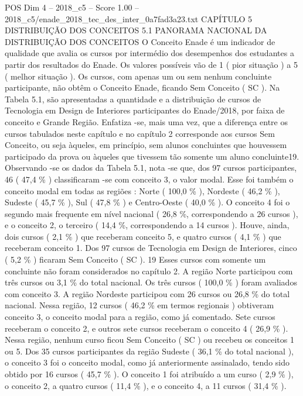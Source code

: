 \begin{textsample}{POS Dim 4 – 2018\_c5 – Score 1.00 – 2018\_c5/enade\_2018\_tec\_des\_inter\_0a7fad3a23.txt}  \label{ex:f4_pos_225}
CAPÍTULO 5 DISTRIBUIÇÃO DOS CONCEITOS 5.1 PANORAMA NACIONAL DA DISTRIBUIÇÃO DOS CONCEITOS O Conceito Enade é um indicador de qualidade que avalia os cursos por intermédio dos desempenhos dos estudantes a partir dos resultados do Enade.
Os valores possíveis vão de 1 ( pior situação ) a 5 ( melhor situação ).
Os cursos, com apenas um ou sem nenhum concluinte participante, não obtêm o Conceito Enade, ficando Sem Conceito ( SC ).
Na Tabela 5.1, são apresentadas a quantidade e a distribuição de cursos de Tecnologia em Design de Interiores participantes do Enade/2018, por faixa de conceito e Grande Região.
Enfatiza -se, mais uma vez, que a diferença entre os cursos tabulados neste capítulo e no capítulo 2 corresponde aos cursos Sem Conceito, ou seja àqueles, em princípio, sem alunos concluintes que houvessem participado da prova ou àqueles que tivessem tão somente um aluno concluinte19.
Observando -se os dados da Tabela 5.1, nota -se que, dos 97 cursos participantes, 46 ( 47,4 \% ) classificaram -se com conceito 3, o valor modal.
Esse foi também o conceito modal em todas as regiões : Norte ( 100,0 \% ), Nordeste ( 46,2 \% ), Sudeste ( 45,7 \% ), Sul ( 47,8 \% ) e Centro-Oeste ( 40,0 \% ).
O conceito 4 foi o segundo mais frequente em nível nacional ( 26,8 \%, correspondendo a 26 cursos ), e o conceito 2, o terceiro ( 14,4 \%, correspondendo a 14 cursos ).
Houve, ainda, dois cursos ( 2,1 \% ) que receberam conceito 5, e quatro cursos ( 4,1 \% ) que receberam conceito 1.
Dos 97 cursos de Tecnologia em Design de Interiores, cinco ( 5,2 \% ) ficaram Sem Conceito ( SC ). 19 Esses cursos com somente um concluinte não foram considerados no capítulo 2.
A região Norte participou com três cursos ou 3,1 \% do total nacional.
Os três cursos ( 100,0 \% ) foram avaliados com conceito 3.
A região Nordeste participou com 26 cursos ou 26,8 \% do total nacional.
Nessa região, 12 cursos ( 46,2 \% em termos regionais ) obtiveram conceito 3, o conceito modal para a região, como já comentado.
Sete cursos receberam o conceito 2, e outros sete cursos receberam o conceito 4 ( 26,9 \% ).
Nessa região, nenhum curso ficou Sem Conceito ( SC ) ou recebeu os conceitos 1 ou 5.
Dos 35 cursos participantes da região Sudeste ( 36,1 \% do total nacional ), o conceito 3 foi o conceito modal, como já anteriormente assinalado, tendo sido obtido por 16 cursos ( 45,7 \% ).
O conceito 1 foi atribuído a um curso ( 2,9 \% ), o conceito 2, a quatro cursos ( 11,4 \% ), e o conceito 4, a 11 cursos ( 31,4 \% ).

\end{textsample}
